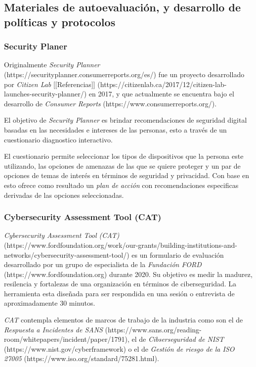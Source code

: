 \documentclass[12pt]{caltech_thesis}
\begin{document}
\subsection{Materiales de autoevaluación, y desarrollo de políticas y protocolos}

\subsubsection{Security Planer}

Originalmente \textit{Security Planner} (https://securityplanner.consumerreports.org/es/) fue un proyecto desarrollado por \textit{Citizen Lab} [[Referencias]] (https://citizenlab.ca/2017/12/citizen-lab-launches-security-planner/) en 2017, y que actualmente se encuentra bajo el desarrollo de \textit{Consumer Reports} (https://www.consumerreports.org/).

El objetivo de \textit{Security Planner} es brindar recomendaciones de seguridad digital basadas en las necesidades e intereses de las personas, esto a través de un cuestionario diagnostico interactivo.

El cuestionario permite seleccionar los tipos de dispositivos que la persona este utilizando, las opciones de amenazas de las que se quiere proteger y un par de opciones de temas de interés en términos de seguridad y privacidad. Con base en esto ofrece como resultado un \textit{plan de acción} con recomendaciones especificas derivadas de las opciones seleccionadas.

\subsubsection{Cybersecurity Assessment Tool (CAT)}

\textit{Cybersecurity Assessment Tool (CAT)} (https://www.fordfoundation.org/work/our-grants/building-institutions-and-networks/cybersecurity-assessment-tool/) es un formulario de evaluación desarrollado por un grupo de especialista de la \textit{Fundación FORD} (https://www.fordfoundation.org) durante 2020. Su objetivo es medir la madurez, resilencia y fortalezas de una organización en términos de ciberseguridad. La herramienta esta diseñada para ser respondida en una sesión o entrevista de aproximadamente 30 minutos.

\textit{CAT} contempla elementos de marcos de trabajo de la industria como son el de \textit{Respuesta a Incidentes de SANS} (https://www.sans.org/reading-room/whitepapers/incident/paper/1791), el de \textit{Cibserseguridad de NIST} (https://www.nist.gov/cyberframework) o el de \textit{Gestión de riesgo de la ISO 27005} (https://www.iso.org/standard/75281.html).
\end{document}
